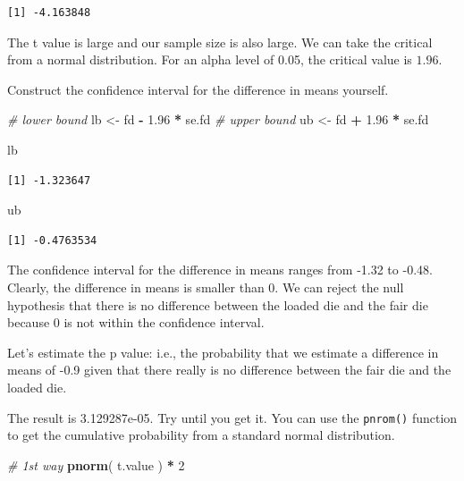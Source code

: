 \documentclass[]{article}
\newenvironment{Shaded}{\begin{snugshade}}{\end{snugshade}}
\newcommand{\KeywordTok}[1]{\textcolor[rgb]{0.13,0.29,0.53}{\textbf{#1}}}
\newcommand{\DecValTok}[1]{\textcolor[rgb]{0.00,0.00,0.81}{#1}}
\newcommand{\FloatTok}[1]{\textcolor[rgb]{0.00,0.00,0.81}{#1}}
\newcommand{\StringTok}[1]{\textcolor[rgb]{0.31,0.60,0.02}{#1}}
\newcommand{\CommentTok}[1]{\textcolor[rgb]{0.56,0.35,0.01}{\textit{#1}}}
\newcommand{\OperatorTok}[1]{\textcolor[rgb]{0.81,0.36,0.00}{\textbf{#1}}}
\newcommand{\NormalTok}[1]{#1}
\theoremstyle{definition}
\theoremstyle{definition}
\theoremstyle{definition}
\theoremstyle{remark}
\begin{document}
\begin{verbatim}
[1] -4.163848
\end{verbatim}

The t value is large and our sample size is also large. We can take the
critical from a normal distribution. For an alpha level of 0.05, the
critical value is \(1.96\).

Construct the confidence interval for the difference in means yourself.

\begin{Shaded}
\begin{Highlighting}[]
\CommentTok{# lower bound}
\NormalTok{lb <-}\StringTok{ }\NormalTok{fd }\OperatorTok{-}\StringTok{ }\FloatTok{1.96} \OperatorTok{*}\StringTok{ }\NormalTok{se.fd}
\CommentTok{# upper bound}
\NormalTok{ub <-}\StringTok{ }\NormalTok{fd }\OperatorTok{+}\StringTok{ }\FloatTok{1.96} \OperatorTok{*}\StringTok{ }\NormalTok{se.fd}

\NormalTok{lb}
\end{Highlighting}
\end{Shaded}

\begin{verbatim}
[1] -1.323647
\end{verbatim}

\begin{Shaded}
\begin{Highlighting}[]
\NormalTok{ub}
\end{Highlighting}
\end{Shaded}

\begin{verbatim}
[1] -0.4763534
\end{verbatim}

The confidence interval for the difference in means ranges from -1.32 to
-0.48. Clearly, the difference in means is smaller than 0. We can reject
the null hypothesis that there is no difference between the loaded die
and the fair die because 0 is not within the confidence interval.

Let's estimate the p value: i.e., the probability that we estimate a
difference in means of -0.9 given that there really is no difference
between the fair die and the loaded die.

The result is 3.129287e-05. Try until you get it. You can use the
\texttt{pnrom()} function to get the cumulative probability from a
standard normal distribution.

\begin{Shaded}
\begin{Highlighting}[]
\CommentTok{# 1st way}
\KeywordTok{pnorm}\NormalTok{( t.value ) }\OperatorTok{*}\StringTok{ }\DecValTok{2}
\end{Highlighting}
\end{Shaded}
\end{document}
